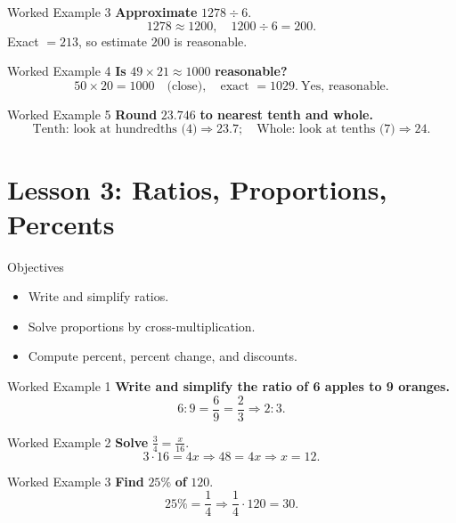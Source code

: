 \documentclass[aspectratio=169]{beamer}
\begin{document}
\begin{frame}{Worked Example 3}
\textbf{Approximate } \(1278 \div 6\).
\[
1278 \approx 1200,\quad 1200\div 6 = 200.
\]
Exact \(=213\), so estimate \(200\) is reasonable.
\end{frame}

\begin{frame}{Worked Example 4}
\textbf{Is } \(49\times 21 \approx 1000\) \textbf{ reasonable?}
\[
50\times 20 = 1000 \quad\text{(close)},\quad \text{exact }=1029.\ \text{Yes, reasonable.}
\]
\end{frame}

\begin{frame}{Worked Example 5}
\textbf{Round } \(23.746\) \textbf{ to nearest tenth and whole.}
\[
\text{Tenth: look at hundredths (4)} \Rightarrow 23.7;\quad \text{Whole: look at tenths (7)} \Rightarrow 24.
\]
\end{frame}

\section{Lesson 3: Ratios, Proportions, Percents}

\begin{frame}{Objectives}
\begin{itemize}
  \item Write and simplify ratios.
  \item Solve proportions by cross-multiplication.
  \item Compute percent, percent change, and discounts.
\end{itemize}
\end{frame}

\begin{frame}{Worked Example 1}
\textbf{Write and simplify the ratio of 6 apples to 9 oranges.}
\[
6:9 = \frac{6}{9} = \frac{2}{3} \Rightarrow 2:3.
\]
\end{frame}

\begin{frame}{Worked Example 2}
\textbf{Solve } \(\frac{3}{4} = \frac{x}{16}\).
\[
3\cdot 16 = 4x \Rightarrow 48 = 4x \Rightarrow x=12.
\]
\end{frame}

\begin{frame}{Worked Example 3}
\textbf{Find } \(25\%\) \textbf{ of } \(120\).
\[
25\% = \frac{1}{4} \Rightarrow \frac{1}{4}\cdot 120 = 30.
\]
\end{frame}
\end{document}
